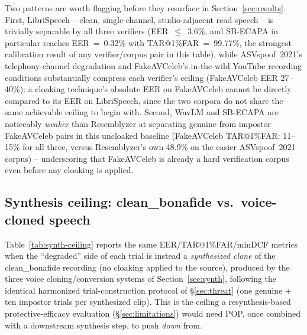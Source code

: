 \documentclass[11pt]{article}
\begin{document}
Two patterns are worth flagging before they resurface in
Section~\ref{sec:results}. First, LibriSpeech -- clean, single-channel,
studio-adjacent read speech -- is trivially separable by all three
verifiers (EER~$\leq$~3.6\%, and SB-ECAPA in particular reaches
EER~=~0.32\% with TAR@1\%FAR~=~99.77\%, the strongest calibration
result of any verifier/corpus pair in this table), while ASVspoof~2021's
telephony-channel degradation and FakeAVCeleb's in-the-wild YouTube
recording conditions substantially compress each verifier's ceiling
(FakeAVCeleb EER 27--40\%): a cloaking technique's absolute EER on
FakeAVCeleb cannot be directly compared to its EER on LibriSpeech,
since the two corpora do not share the same achievable ceiling to
begin with. Second, WavLM and SB-ECAPA are noticeably \emph{weaker}
than Resemblyzer at separating genuine from impostor FakeAVCeleb pairs
in this uncloaked baseline (FakeAVCeleb TAR@1\%FAR: 11--15\% for all
three, versus Resemblyzer's own 48.9\% on the easier ASVspoof~2021
corpus) -- underscoring that FakeAVCeleb is already a hard
verification corpus even before any cloaking is applied.

\subsection{Synthesis ceiling: clean\_bonafide vs.\ voice-cloned speech}
\label{sec:synth-ceiling}
Table~\ref{tab:synth-ceiling} reports the same EER/TAR@1\%FAR/minDCF
metrics when the ``degraded'' side of each trial is instead a
\emph{synthesized clone} of the clean\_bonafide recording (no
cloaking applied to the source), produced by the three voice
cloning/conversion systems of Section~\ref{sec:synth}, following the
identical harmonized trial-construction protocol of
\S\ref{sec:threat} (one genuine + ten impostor trials per synthesized
clip). This is the ceiling a resynthesis-based protective-efficacy
evaluation (\S\ref{sec:limitations}) would need POP, once combined
with a downstream synthesis step, to push \emph{down} from.
\end{document}
